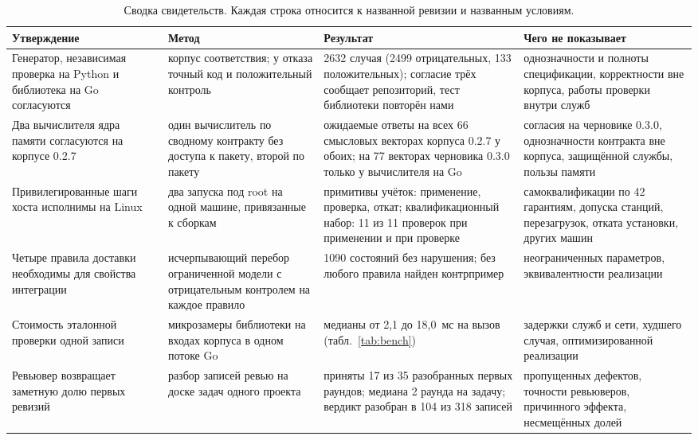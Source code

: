 \documentclass[10pt,a4paper]{article}
\begin{document}
\begin{table}[t]
\centering
\caption{Сводка свидетельств. Каждая строка относится к названной ревизии и названным условиям.}
\label{tab:evidence}
\footnotesize
\begin{tabular}{L{3.0cm}L{3.6cm}L{4.3cm}L{3.8cm}}
\toprule
Утверждение & Метод & Результат & Чего не показывает \\
\midrule
Генератор, независимая проверка на Python и библиотека на Go согласуются & корпус соответствия; у отказа точный код и положительный контроль & 2632 случая (2499 отрицательных, 133 положительных); согласие трёх сообщает репозиторий, тест библиотеки повторён нами & однозначности и полноты спецификации, корректности вне корпуса, работы проверки внутри служб \\
\addlinespace
Два вычислителя ядра памяти согласуются на корпусе 0.2.7 & один вычислитель по сводному контракту без доступа к пакету, второй по пакету & ожидаемые ответы на всех 66 смысловых векторах корпуса 0.2.7 у обоих; на 77 векторах черновика 0.3.0 только у вычислителя на Go & согласия на черновике 0.3.0, однозначности контракта вне корпуса, защищённой службы, пользы памяти \\
\addlinespace
Привилегированные шаги хоста исполнимы на Linux & два запуска под root на одной машине, привязанные к сборкам & примитивы учёток: применение, проверка, откат; квалификационный набор: 11 из 11 проверок при применении и при проверке & самоквалификации по 42 гарантиям, допуска станций, перезагрузок, отката установки, других машин \\
\addlinespace
Четыре правила доставки необходимы для свойства интеграции & исчерпывающий перебор ограниченной модели с отрицательным контролем на каждое правило & 1090 состояний без нарушения; без любого правила найден контрпример & неограниченных параметров, эквивалентности реализации \\
\addlinespace
Стоимость эталонной проверки одной записи & микрозамеры библиотеки на входах корпуса в одном потоке Go & медианы от 2,1 до 18,0~мс на вызов (табл.~\ref{tab:bench}) & задержки служб и сети, худшего случая, оптимизированной реализации \\
\addlinespace
Ревьювер возвращает заметную долю первых ревизий & разбор записей ревью на доске задач одного проекта & приняты 17 из 35 разобранных первых раундов; медиана 2 раунда на задачу; вердикт разобран в 104 из 318 записей & пропущенных дефектов, точности ревьюверов, причинного эффекта, несмещённых долей \\
\bottomrule
\end{tabular}
\end{table}
\end{document}
